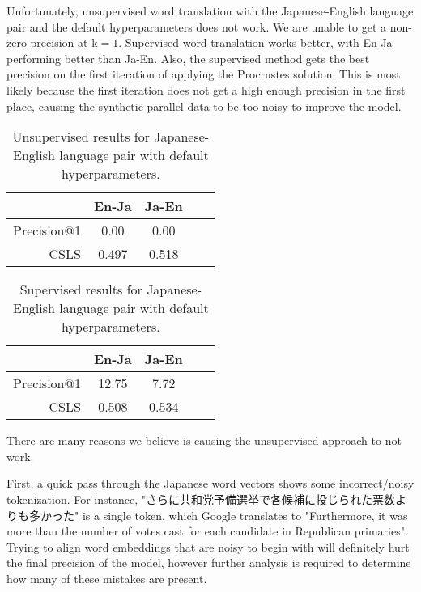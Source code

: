 \documentclass{article}
\begin{document}
Unfortunately, unsupervised word translation with the Japanese-English language
pair and the default hyperparameters does not work. We are unable to get a
non-zero precision at $\text{k}=1$. Supervised word translation works better,
with En-Ja performing better than Ja-En. Also, the supervised method gets the best
precision on the first iteration of applying the Procrustes solution. This is most
likely because the first iteration does not get a high enough precision in the 
first place, causing the synthetic parallel data to be too noisy to improve the
model.

\begin{table}[h]
  \centering
  \begin{tabular}{||r|cc|cc||}
    \hline
    & En-Ja & Ja-En \\
    \hline
    Precision@1 &  0.00 &  0.00 \\
    CSLS        & 0.497 & 0.518 \\
    \hline
  \end{tabular}
  \caption{Unsupervised results for Japanese-English language pair with default hyperparameters.}
\end{table}

\begin{table}[h]
  \centering
  \begin{tabular}{||r|cc|cc||}
    \hline
    & En-Ja & Ja-En \\
    \hline
    Precision@1 & 12.75 &  7.72 \\
    CSLS        & 0.508 & 0.534 \\
    \hline
  \end{tabular}
  \caption{Supervised results for Japanese-English language pair with default hyperparameters.}
\end{table}

There are many reasons we believe is causing the unsupervised approach to not work.

First, a quick pass through the Japanese word vectors shows some incorrect/noisy
tokenization. For instance, "さらに共和党予備選挙で各候補に投じられた票数よりも多かった"
is a single token, which Google translates to "Furthermore, it was more than
the number of votes cast for each candidate in Republican primaries". Trying to
align word embeddings that are noisy to begin with will definitely hurt the final
precision of the model, however further analysis is required to determine how
many of these mistakes are present.
\end{document}
